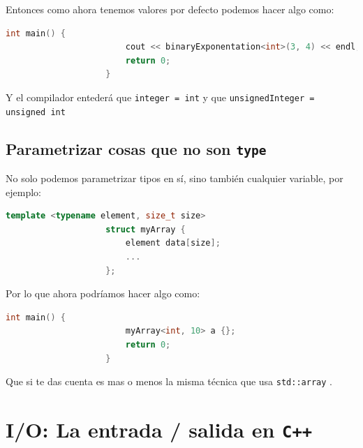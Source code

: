 \documentclass[12pt, fleqn]{report}                             %
\theoremstyle{break}                                            %
\newcommand{\textCode}[1]  { \texttt{#1} }                      %
\newcommand{\Cpp}{\ignorespaces\textCode{C++}}                  %
\begin{document}
                Entonces como ahora tenemos valores por defecto podemos hacer algo como:
                \begin{lstlisting}[language=C++, gobble=20]
                    int main() {
                        cout << binaryExponentation<int>(3, 4) << endl;
                        return 0;
                    }
                \end{lstlisting}

                Y el compilador entederá que \textCode{integer = int} y que 
                \textCode{unsignedInteger = unsigned int}

            \subsection{Parametrizar cosas que no son \textCode{type}}

                No solo podemos parametrizar tipos en sí, sino también cualquier variable, 
                por ejemplo:
                \begin{lstlisting}[language=C++, gobble=20]
                    template <typename element, size_t size>
                    struct myArray {
                        element data[size];  
                        ...
                    };
                \end{lstlisting}

                Por lo que ahora podríamos hacer algo como:
                \begin{lstlisting}[language=C++, gobble=20]
                    int main() {
                        myArray<int, 10> a {};
                        return 0;
                    }
                \end{lstlisting}

                Que si te das cuenta es mas o menos la misma técnica que usa \textCode{std::array}.



        \clearpage
        \section{I/O: La entrada / salida en \Cpp}
\end{document}
